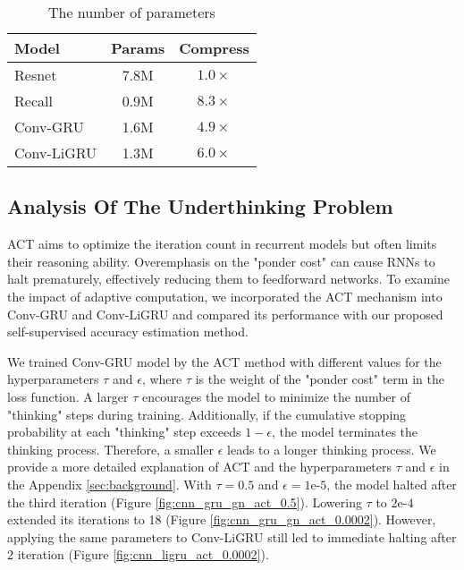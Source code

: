 \begin{table}[t!]
\centering
\caption{The number of parameters}
\begin{tabular}{l|cc}
\hline
\textbf{Model} & \textbf{Params} & \textbf{Compress} \\ \hline
Resnet & 7.8M & $1.0\times$\\
Recall & 0.9M & $8.3\times$ \\
Conv-GRU & 1.6M & $4.9\times$ \\
Conv-LiGRU & 1.3M & $6.0\times$ \\ \hline
\end{tabular}
\label{tab:params}
\end{table}

\subsection{Analysis Of The Underthinking Problem}

ACT aims to optimize the iteration count in recurrent models but often limits their reasoning ability. 
Overemphasis on the "ponder cost" can cause RNNs to halt prematurely, effectively reducing them to feedforward networks. 
To examine the impact of adaptive computation, we incorporated the ACT mechanism into Conv-GRU and Conv-LiGRU and compared its performance with our proposed self-supervised accuracy estimation method.  

We trained Conv-GRU model by the ACT method with different values for the hyperparameters $\tau$ and $\epsilon$, where $\tau$ is the weight of the "ponder cost" term in the loss function. A larger $\tau$ encourages the model to minimize the number of "thinking" steps during training. 
Additionally, if the cumulative stopping probability at each "thinking" step exceeds $1 - \epsilon$, the model terminates the thinking process. Therefore, a smaller $\epsilon$ leads to a longer thinking process. 
We provide a more detailed explanation of ACT and the hyperparameters $\tau$ and $\epsilon$ in the Appendix \ref{sec:background}. 
With $\tau = 0.5$ and $\epsilon = 1\text{e-5}$, the model halted after the third iteration (Figure \ref{fig:cnn_gru_gn_act_0.5}). 
Lowering $\tau$ to $2\text{e-4}$ extended its iterations to 18 (Figure \ref{fig:cnn_gru_gn_act_0.0002}). 
However, applying the same parameters to Conv-LiGRU still led to immediate halting after 2 iteration (Figure \ref{fig:cnn_ligru_act_0.0002}).

